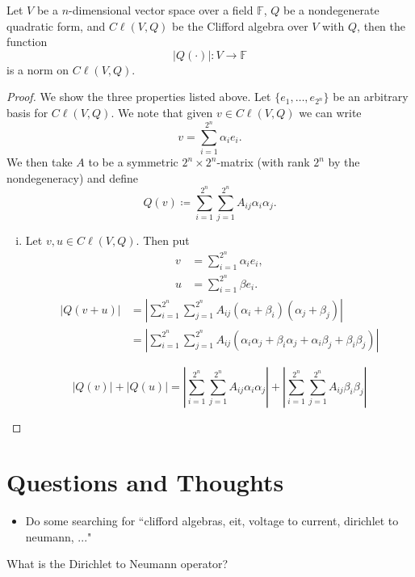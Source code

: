 \begin{proposition}
Let $V$ be a $n$-dimensional vector space over a field $\mathbb{F}$, $Q$ be a nondegenerate quadratic form, and $C\ell(V,Q)$ be the Clifford algebra over $V$ with $Q$, then the function
\[
|Q(\cdot)| \colon V \to \mathbb{F}
\]
is a norm on $C\ell(V,Q)$.
\end{proposition}

\begin{proof}
We show the three properties listed above.  Let $\{e_1,\dots,e_{2^n}\}$ be an arbitrary basis for $C\ell(V,Q)$. We note that given $v \in C\ell(V,Q)$ we can write
\[
v=\sum_{i=1}^{2^n} \alpha_i e_i.
\]
We then take $A$ to be a symmetric $2^n\times 2^n$-matrix (with rank $2^n$ by the nondegeneracy) and define
\[
Q(v)\coloneqq \sum_{i=1}^{2^n} \sum_{j=1}^{2^n} A_{ij}\alpha_i \alpha_j.
\]
\begin{enumerate}[(i)]
    \item Let $v,u \in C\ell(V,Q)$.  Then put
    \begin{align*}
        v &= \sum_{i=1}^{2^n} \alpha_i e_i,\\
        u &= \sum_{i=1}^{2^n} \beta e_i.
    \end{align*}
    \begin{align*}
    |Q(v+u)|&=\left|\sum_{i=1}^{2^n} \sum_{j=1}^{2^n} A_{ij}(\alpha_i+\beta_i) (\alpha_j+\beta_j)\right|\\
    &= \left|\sum_{i=1}^{2^n} \sum_{j=1}^{2^n} A_{ij}(\alpha_i \alpha_j +\beta_i \alpha_j+ \alpha_i\beta_j +\beta_i\beta_j)\right|
    \end{align*}
    
    \[
    |Q(v)|+|Q(u)| = \left|\sum_{i=1}^{2^n} \sum_{j=1}^{2^n} A_{ij}\alpha_i \alpha_j\right| + \left|\sum_{i=1}^{2^n} \sum_{j=1}^{2^n} A_{ij}\beta_i \beta_j\right|
    \]
\end{enumerate}
\end{proof}



\section{Questions and Thoughts}

\begin{itemize}
    \item Do some searching for ``clifford algebras, eit, voltage to current, dirichlet to neumann, ..."
\end{itemize}

\begin{question}
What is the Dirichlet to Neumann operator?
\end{question}

